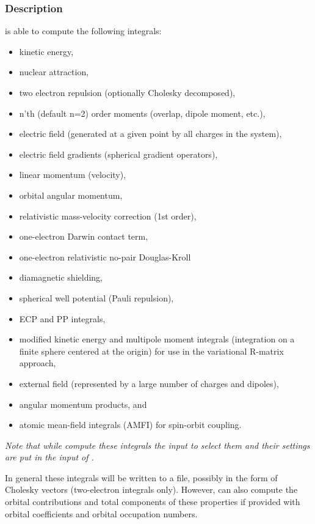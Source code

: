 \subsubsection{Description}
\label{UG:sec:seward_description}
 is able to compute the following integrals:
\begin{itemize}
\itemsep 9pt plus 3pt minus 3pt
\item kinetic energy,
\item nuclear attraction,
\item two electron repulsion (optionally Cholesky decomposed),
\item n'th (default n=2) order moments (overlap, dipole moment, etc.),
\item electric field (generated at a given point by all charges in the system),
\item electric field gradients (spherical gradient operators),
\item linear momentum (velocity),
\item orbital angular momentum,
\item relativistic mass-{}velocity correction (1st order),
\item one-{}electron Darwin contact term,
\item one-{}electron relativistic no-pair Douglas-Kroll
\item diamagnetic shielding,
\item spherical well potential (Pauli repulsion),
\item ECP and PP integrals,
\item modified kinetic energy and multipole moment integrals
      (integration on a finite sphere centered at the origin) for use in
      the variational R-matrix approach,
\item external field (represented by a large number of charges and dipoles),
\item angular momentum products, and
\item atomic mean-field integrals (AMFI) for spin-orbit coupling.
\end{itemize}
{\it Note that while  compute these integrals the input to
select them and their settings are put in the input of .}

In general these integrals will be written to a file, possibly in
the form of Cholesky vectors (two-electron integrals only). However,
 can also compute the orbital contributions and total components of
these properties if provided with orbital coefficients and
orbital occupation numbers.

